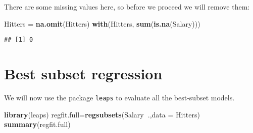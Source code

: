 \documentclass[]{article}
\newenvironment{Shaded}{\begin{snugshade}}{\end{snugshade}}
\newcommand{\KeywordTok}[1]{\textcolor[rgb]{0.13,0.29,0.53}{\textbf{#1}}}
\newcommand{\DataTypeTok}[1]{\textcolor[rgb]{0.13,0.29,0.53}{#1}}
\newcommand{\StringTok}[1]{\textcolor[rgb]{0.31,0.60,0.02}{#1}}
\newcommand{\OperatorTok}[1]{\textcolor[rgb]{0.81,0.36,0.00}{\textbf{#1}}}
\newcommand{\NormalTok}[1]{#1}
\begin{document}
There are some missing values here, so before we proceed we will remove
them:

\begin{Shaded}
\begin{Highlighting}[]
\NormalTok{Hitters =}\StringTok{ }\KeywordTok{na.omit}\NormalTok{(Hitters)}
\KeywordTok{with}\NormalTok{(Hitters, }\KeywordTok{sum}\NormalTok{(}\KeywordTok{is.na}\NormalTok{(Salary)))}
\end{Highlighting}
\end{Shaded}

\begin{verbatim}
## [1] 0
\end{verbatim}

\section{Best subset regression}\label{best-subset-regression}

We will now use the package \texttt{leaps} to evaluate all the
best-subset models.

\begin{Shaded}
\begin{Highlighting}[]
\KeywordTok{library}\NormalTok{(leaps)}
\NormalTok{regfit.full=}\KeywordTok{regsubsets}\NormalTok{(Salary}\OperatorTok{~}\NormalTok{.,}\DataTypeTok{data =}\NormalTok{ Hitters)}
\KeywordTok{summary}\NormalTok{(regfit.full)}
\end{Highlighting}
\end{Shaded}
\end{document}
